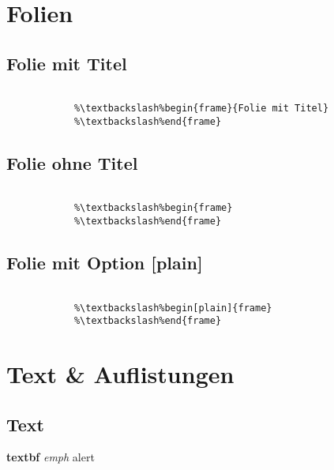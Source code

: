 \section{Folien}

	\subsection{Folie mit Titel}
	\begin{frame}[fragile]{\subsecname}

		\begin{lstlisting}[escapechar=\%]
			%\%% Folie mit Titel

			%\textbackslash%begin{frame}{Folie mit Titel}
			%\textbackslash%end{frame}
		\end{lstlisting}

	\end{frame}

	\subsection{Folie ohne Titel}
	\begin{frame}[fragile]

		\begin{lstlisting}[escapechar=\%]
			%\%% Folie ohne Titel
			
			%\textbackslash%begin{frame}
			%\textbackslash%end{frame}
		\end{lstlisting}
		
	\end{frame}

	\subsection{Folie mit Option [plain]}
	\begin{frame}

		\begin{lstlisting}[escapechar=\%]
			%\%% Folie mit Option [plain]

			%\textbackslash%begin[plain]{frame}
			%\textbackslash%end{frame}
		\end{lstlisting}

	\end{frame}

\section{Text \& Auflistungen}

	\subsection{Text}
	\begin{frame}{\subsecname}
		\textbf{textbf}
		\emph{emph}
		\alert{alert}
		\color{gray}{custom color}
	\end{frame}
	
